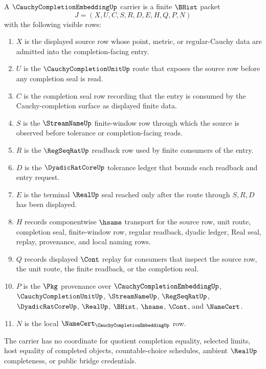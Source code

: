 \begin{definition}
\label{def:cauchy-completion-embedding-carrier}
A $\CauchyCompletionEmbeddingUp$ carrier is a finite $\BHist$ packet
$$
J=(X,U,C,S,R,D,E,H,Q,P,N)
$$
with the following visible rows:
\begin{enumerate}
\item $X$ is the displayed source row whose point, metric, or regular-Cauchy data are admitted into the completion-facing entry.
\item $U$ is the $\CauchyCompletionUnitUp$ route that exposes the source row before any completion seal is read.
\item $C$ is the completion seal row recording that the entry is consumed by the Cauchy-completion surface as displayed finite data.
\item $S$ is the $\StreamNameUp$ finite-window row through which the source is observed before tolerance or completion-facing reads.
\item $R$ is the $\RegSeqRatUp$ readback row used by finite consumers of the entry.
\item $D$ is the $\DyadicRatCoreUp$ tolerance ledger that bounds each readback and entry request.
\item $E$ is the terminal $\RealUp$ seal reached only after the route through $S,R,D$ has been displayed.
\item $H$ records componentwise $\hsame$ transport for the source row, unit route, completion seal, finite-window row, regular readback, dyadic ledger, Real seal, replay, provenance, and local naming rows.
\item $Q$ records displayed $\Cont$ replay for consumers that inspect the source row, the unit route, the finite readback, or the completion seal.
\item $P$ is the $\Pkg$ provenance over $\CauchyCompletionEmbeddingUp$, $\CauchyCompletionUnitUp$, $\StreamNameUp$, $\RegSeqRatUp$, $\DyadicRatCoreUp$, $\RealUp$, $\BHist$, $\hsame$, $\Cont$, and $\NameCert$.
\item $N$ is the local $\NameCert_{\CauchyCompletionEmbeddingUp}$ row.
\end{enumerate}
The carrier has no coordinate for quotient completion equality, selected limits, host equality of completed objects, countable-choice schedules, ambient $\RealUp$ completeness, or public bridge credentials.
\end{definition}

